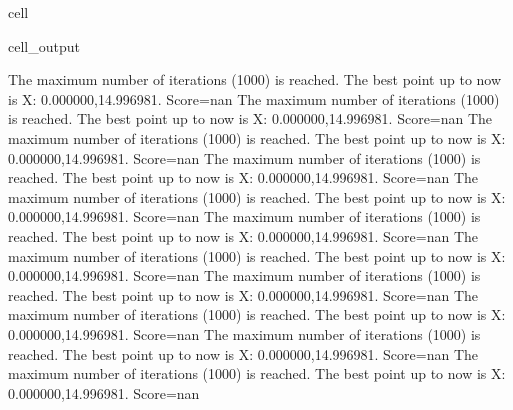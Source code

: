 \documentclass[letterpaper,10pt,english]{jupyterBook}
\begin{document}
\begin{sphinxuseclass}{cell}
\begin{sphinxVerbatimOutput}
\begin{sphinxuseclass}{cell_output}
\begin{sphinxVerbatim}[commandchars=\\\{\}]
The maximum number of iterations (1000) is reached. The best point up to now is X: \PYGZob{}0.000000,14.996981\PYGZcb{}. Score=\PYGZhy{}nan
The maximum number of iterations (1000) is reached. The best point up to now is X: \PYGZob{}0.000000,14.996981\PYGZcb{}. Score=\PYGZhy{}nan
The maximum number of iterations (1000) is reached. The best point up to now is X: \PYGZob{}0.000000,14.996981\PYGZcb{}. Score=\PYGZhy{}nan
The maximum number of iterations (1000) is reached. The best point up to now is X: \PYGZob{}0.000000,14.996981\PYGZcb{}. Score=\PYGZhy{}nan
The maximum number of iterations (1000) is reached. The best point up to now is X: \PYGZob{}0.000000,14.996981\PYGZcb{}. Score=\PYGZhy{}nan
The maximum number of iterations (1000) is reached. The best point up to now is X: \PYGZob{}0.000000,14.996981\PYGZcb{}. Score=\PYGZhy{}nan
The maximum number of iterations (1000) is reached. The best point up to now is X: \PYGZob{}0.000000,14.996981\PYGZcb{}. Score=\PYGZhy{}nan
The maximum number of iterations (1000) is reached. The best point up to now is X: \PYGZob{}0.000000,14.996981\PYGZcb{}. Score=\PYGZhy{}nan
The maximum number of iterations (1000) is reached. The best point up to now is X: \PYGZob{}0.000000,14.996981\PYGZcb{}. Score=\PYGZhy{}nan
The maximum number of iterations (1000) is reached. The best point up to now is X: \PYGZob{}0.000000,14.996981\PYGZcb{}. Score=\PYGZhy{}nan
The maximum number of iterations (1000) is reached. The best point up to now is X: \PYGZob{}0.000000,14.996981\PYGZcb{}. Score=\PYGZhy{}nan
\end{sphinxVerbatim}


\end{sphinxuseclass}
\end{sphinxVerbatimOutput}
\end{sphinxuseclass}
\end{document}
